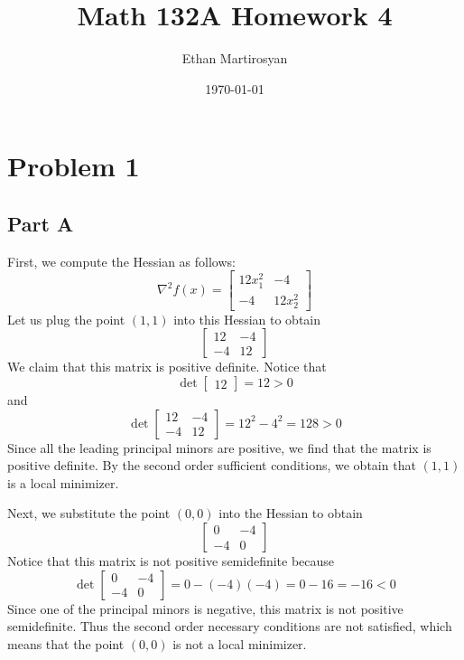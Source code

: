 \documentclass[12pt]{article}
\begin{document}
 
\title{Math 132A Homework 4}
\author{Ethan Martirosyan}
\date{\today}
\maketitle
{}
\hfuzz=50pt
\section*{Problem 1}
\subsection*{Part A}
First, we compute the Hessian as follows:
\[
\nabla^2 f(x) =
\begin{bmatrix}
12x_1^2 & -4\\
-4 & 12x_2^2
\end{bmatrix}
\] Let us plug the point $(1,1)$ into this Hessian to obtain
\[
\begin{bmatrix}
12 & -4\\
-4 & 12
\end{bmatrix}
\] We claim that this matrix is positive definite. Notice that
\[
\det \begin{bmatrix}
12
\end{bmatrix} = 12 > 0
\] and
\[
\det \begin{bmatrix}
12 & -4\\
-4 & 12
\end{bmatrix} = 12^2 - 4^2 = 128 > 0
\] Since all the leading principal minors are positive, we find that the matrix is positive definite. By the second order sufficient conditions, we obtain that $(1,1)$ is a local minimizer.

Next, we substitute the point $(0,0)$ into the Hessian to obtain
\[
\begin{bmatrix}
0 & -4\\
-4 & 0
\end{bmatrix}
\] Notice that this matrix is not positive semidefinite because
\[
\det \begin{bmatrix}
0 & -4\\
-4 & 0
\end{bmatrix} = 0 - (-4)(-4) = 0 - 16 = -16 < 0
\] Since one of the principal minors is negative, this matrix is not positive semidefinite. Thus the second order necessary conditions are not satisfied, which means that the point $(0,0)$ is not a local minimizer.
\end{document}
